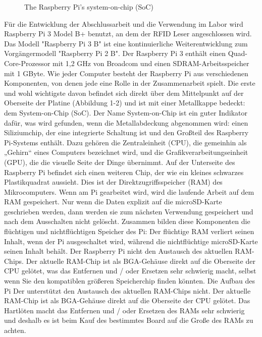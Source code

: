 \begin{figure}
	\caption{The Raspberry Pi’s system-on-chip (SoC)}
	\label{fig:rasp_soc}
\end{figure}

Für die Entwicklung der Abschlussarbeit und die Verwendung im Labor wird Raspberry Pi 3 Model B+ benutzt, an dem der RFID Leser angeschlossen wird. Das Modell "Raspberry Pi 3 B" ist eine kontinuierliche Weiterentwicklung zum Vorgängermodell "Raspberry Pi 2 B".
Der Raspberry Pi 3 enthält einen Quad-Core-Prozessor mit 1,2 GHz von Broadcom und einen SDRAM-Arbeitsspeicher mit 1 GByte. Wie jeder Computer besteht der Raspberry Pi aus verschiedenen Komponenten, von denen jede eine Rolle in der Zusammenarbeit spielt. Die erste und wohl wichtigste davon befindet sich direkt über dem Mittelpunkt auf der Oberseite der Platine (Abbildung 1-2) und ist mit einer Metallkappe bedeckt: dem System-on-Chip (SoC). Der Name System-on-Chip ist ein guter Indikator dafür, was wird gefunden, wenn die Metallabdeckung abgenommen wird: einen Siliziumchip, der eine integrierte Schaltung ist und den Großteil des Raspberry Pi-Systems enthält. Dazu gehören die Zentraleinheit (CPU), die gemeinhin als „Gehirn“ eines Computers bezeichnet wird, und die Grafikverarbeitungseinheit (GPU), die die visuelle Seite der Dinge übernimmt.\cite[p. 11]{gareth:raspi} Auf der Unterseite des Raspberry Pi befindet sich einen weiteren Chip, der wie ein kleines schwarzes Plastikquadrat aussieht. Dies ist der Direktzugriffsspeicher (RAM) des Mikrocomputers. Wenn am Pi gearbeitet wird, wird die laufende Arbeit auf dem RAM gespeichert. Nur wenn die Daten explizit auf die microSD-Karte geschrieben werden, dann werden sie zum nächsten Verwendung gespeichert und nach dem Ausschalten nicht gelöscht. Zusammen bilden diese Komponenten die flüchtigen und nichtflüchtigen Speicher des Pi: Der flüchtige RAM verliert seinen Inhalt, wenn der Pi ausgeschaltet wird, während die nichtflüchtige microSD-Karte seinen Inhalt behält. Der Raspberry Pi  nicht den Austausch des aktuellen RAM-Chips. Der aktuelle RAM-Chip ist als BGA-Gehäuse direkt auf die Oberseite der CPU gelötet, was das Entfernen und / oder Ersetzen sehr schwierig macht, selbst wenn Sie den kompatiblen größeren Speicherchip finden könnten. Die Aufbau des Pi Der unterstützt den Austausch des aktuellen RAM-Chips nicht. Der aktuelle RAM-Chip ist als BGA-Gehäuse direkt auf die Oberseite der CPU gelötet. Das Hartlöten macht das Entfernen und / oder Ersetzen des RAMs sehr schwierig und deshalb es ist beim Kauf des bestimmtes Board auf die Große des RAMs zu achten.

